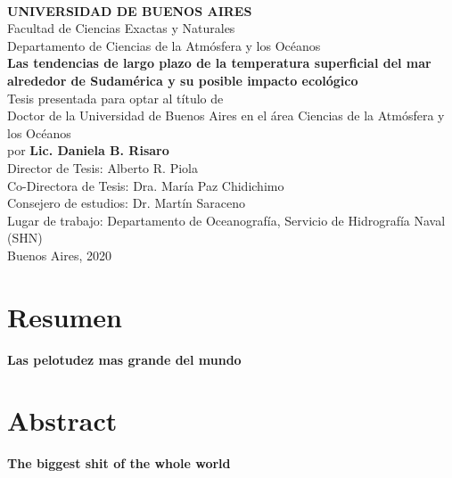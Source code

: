 \documentclass[a4paper,12pt,twoside]{book}
\begin{document}
\frontmatter


\thispagestyle{empty}

\begin{center} 
	\large{
		\vspace{1cm}\\
		\textbf{UNIVERSIDAD DE BUENOS AIRES}\\
		Facultad de Ciencias Exactas y Naturales\\
		Departamento de Ciencias de la Atmósfera y los Océanos\vspace{1.25cm}\\
		\textbf{\LARGE Las tendencias de largo plazo de la temperatura superficial del mar alrededor de	Sudamérica y su posible impacto ecológico} 
		\vspace{0.5cm}\\ 
		Tesis presentada para optar al título de \\
		Doctor de la Universidad de Buenos Aires en el área Ciencias de la Atmósfera y los Océanos\\
		por \textbf{Lic. Daniela B. Risaro} \vspace{1.25cm}\\ 
		Director de Tesis: Alberto R. Piola\\
		Co-Directora de Tesis: Dra. María Paz Chidichimo\\
		Consejero de estudios: Dr. Martín Saraceno  \\
		Lugar de trabajo: Departamento de Oceanografía, Servicio de Hidrografía Naval (SHN)
		\vspace{1.25cm}\\ 
		Buenos Aires, 2020
	}
\end{center}


\chapter*{Resumen}

\vspace{-1cm}
\begin{center}
	\textbf{\large{Las pelotudez mas grande del mundo}}
\end{center}


\chapter*{Abstract}
\vspace{-1cm}
\begin{center}
\textbf{\large{The biggest shit of the whole world}}
\end{center}
\end{document}
